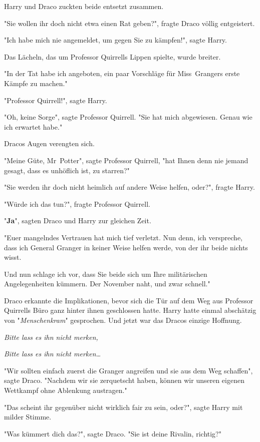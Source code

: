 {Harry und Draco zuckten beide entsetzt zusammen.

"Sie wollen ihr doch nicht etwa einen Rat geben?", fragte Draco völlig entgeistert.

"Ich habe mich nie angemeldet, um gegen Sie zu kämpfen!", sagte Harry.

Das Lächeln, das um Professor Quirrells Lippen spielte, wurde breiter.

"In der Tat habe ich angeboten, ein paar Vorschläge für Miss~Grangers erste Kämpfe zu machen."

"Professor Quirrell!", sagte Harry.

"Oh, keine Sorge", sagte Professor Quirrell. "Sie hat mich abgewiesen. Genau wie ich erwartet habe."

Dracos Augen verengten sich.

"Meine Güte, Mr~Potter", sagte Professor Quirrell, "hat Ihnen denn nie jemand gesagt, dass es unhöflich ist, zu starren?"

"Sie werden ihr doch nicht heimlich auf andere Weise helfen, oder?", fragte Harry.

"Würde ich das tun?", fragte Professor Quirrell.

"\textbf{Ja}", sagten Draco und Harry zur gleichen Zeit.

"Euer mangelndes Vertrauen hat mich tief verletzt. Nun denn, ich verspreche, dass ich General Granger in keiner Weise helfen werde, von der ihr beide nichts wisst.

Und nun schlage ich vor, dass Sie beide sich um Ihre militärischen Angelegenheiten kümmern. Der November naht, und zwar schnell."

Draco erkannte die Implikationen, bevor sich die Tür auf dem Weg aus Professor Quirrells Büro ganz hinter ihnen geschlossen hatte. Harry hatte einmal abschätzig von "\emph{Menschenkram}" gesprochen. Und jetzt war das Dracos einzige Hoffnung.

\emph{Bitte lass es ihn nicht merken,}

\emph{Bitte lass es ihn nicht merken…}

"Wir sollten einfach zuerst die Granger angreifen und sie aus dem Weg schaffen", sagte Draco. "Nachdem wir sie zerquetscht haben, können wir unseren eigenen Wettkampf ohne Ablenkung austragen."

"Das scheint ihr gegenüber nicht wirklich fair zu sein, oder?", sagte Harry mit milder Stimme.

"Was kümmert dich das?", sagte Draco. "Sie ist deine Rivalin, richtig?"

}
